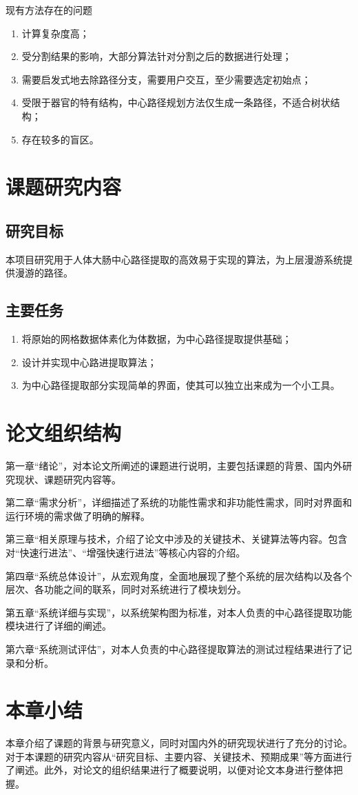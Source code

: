 现有方法存在的问题

\begin{enumerate}
    \item 计算复杂度高；
　　\item 受分割结果的影响，大部分算法针对分割之后的数据进行处理；
　　\item 需要启发式地去除路径分支，需要用户交互，至少需要选定初始点；
　　\item 受限于器官的特有结构，中心路径规划方法仅生成一条路径，不适合树状结构；
　　\item 存在较多的盲区。
\end{enumerate}

\section{课题研究内容}
\subsection{研究目标}
本项目研究用于人体大肠中心路径提取的高效易于实现的算法，为上层漫游系统提供漫游的路径。

\subsection{主要任务}

\begin{enumerate}
    \item 将原始的网格数据体素化为体数据，为中心路径提取提供基础；
    \item 设计并实现中心路进提取算法；
    \item 为中心路径提取部分实现简单的界面，使其可以独立出来成为一个小工具。
\end{enumerate}

\section{论文组织结构}
第一章“绪论”，对本论文所阐述的课题进行说明，主要包括课题的背景、国内外研究现状、课题研究内容等。

第二章“需求分析”，详细描述了系统的功能性需求和非功能性需求，同时对界面和运行环境的需求做了明确的解释。

第三章“相关原理与技术，介绍了论文中涉及的关键技术、关键算法等内容。包含对“快速行进法”、“增强快速行进法”等核心内容的介绍。

第四章“系统总体设计”，从宏观角度，全面地展现了整个系统的层次结构以及各个层次、各功能之间的联系，同时对系统进行了模块划分。

第五章“系统详细与实现”，以系统架构图为标准，对本人负责的中心路径提取功能模块进行了详细的阐述。

第六章“系统测试评估”，对本人负责的中心路径提取算法的测试过程结果进行了记录和分析。

\section{本章小结}
本章介绍了课题的背景与研究意义，同时对国内外的研究现状进行了充分的讨论。对于本课题的研究内容从“研究目标、主要内容、关键技术、预期成果”等方面进行了阐述。此外，对论文的组织结果进行了概要说明，以便对论文本身进行整体把握。
